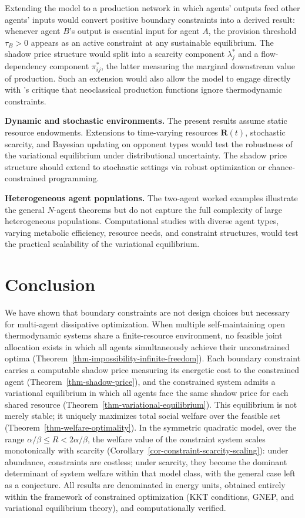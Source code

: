 \documentclass[11pt]{article}
\theoremstyle{plain}
\theoremstyle{definition}
\theoremstyle{remark}
\let\origsection\section
\renewcommand{\section}{\needspace{12\baselineskip}\origsection}
\begin{document}
Extending the model to a production network in which agents' outputs
feed other agents' inputs would convert positive boundary constraints
into a derived result: whenever agent \(B\)'s output is essential input
for agent \(A\), the provision threshold \(\tau_B > 0\) appears as an
active constraint at any sustainable equilibrium. The shadow price
structure would split into a scarcity component \(\lambda_j^*\) and a
flow-dependency component \(\pi_{ij}^*\), the latter measuring the
marginal downstream value of production. Such an extension would also
allow the model to engage directly with \citet{GeorgescuRoegen1971}'s
critique that neoclassical production functions ignore thermodynamic
constraints.

\textbf{Dynamic and stochastic environments.} The present results assume
static resource endowments. Extensions to time-varying resources
\(\mathbf{R}(t)\), stochastic scarcity, and Bayesian updating on
opponent types \citep{OsborneRubinstein1994} would test the robustness
of the variational equilibrium under distributional uncertainty. The
shadow price structure should extend to stochastic settings via robust
optimization or chance-constrained programming.

\textbf{Heterogeneous agent populations.} The two-agent worked examples
illustrate the general \(N\)-agent theorems but do not capture the full
complexity of large heterogeneous populations. Computational studies
with diverse agent types, varying metabolic efficiency, resource needs,
and constraint structures, would test the practical scalability of the
variational equilibrium.

\section{Conclusion}\label{conclusion}

We have shown that boundary constraints are not design choices but
necessary for multi-agent dissipative optimization. When multiple
self-maintaining open thermodynamic systems share a finite-resource
environment, no feasible joint allocation exists in which all agents
simultaneously achieve their unconstrained optima
(Theorem~\ref{thm-impossibility-infinite-freedom}). Each boundary
constraint carries a computable shadow price measuring its energetic
cost to the constrained agent (Theorem~\ref{thm-shadow-price}), and the
constrained system admits a variational equilibrium in which all agents
face the same shadow price for each shared resource
(Theorem~\ref{thm-variational-equilibrium}). This equilibrium is not
merely stable; it uniquely maximizes total social welfare over the
feasible set (Theorem~\ref{thm-welfare-optimality}). In the symmetric
quadratic model, over the range \(\alpha/\beta \leq R < 2\alpha/\beta\),
the welfare value of the constraint system scales monotonically with
scarcity (Corollary~\ref{cor-constraint-scarcity-scaling}): under
abundance, constraints are costless; under scarcity, they become the
dominant determinant of system welfare within that model class, with the
general case left as a conjecture. All results are denominated in energy
units, obtained entirely within the framework of constrained
optimization (KKT conditions, GNEP, and variational equilibrium theory),
and computationally verified.
\end{document}
